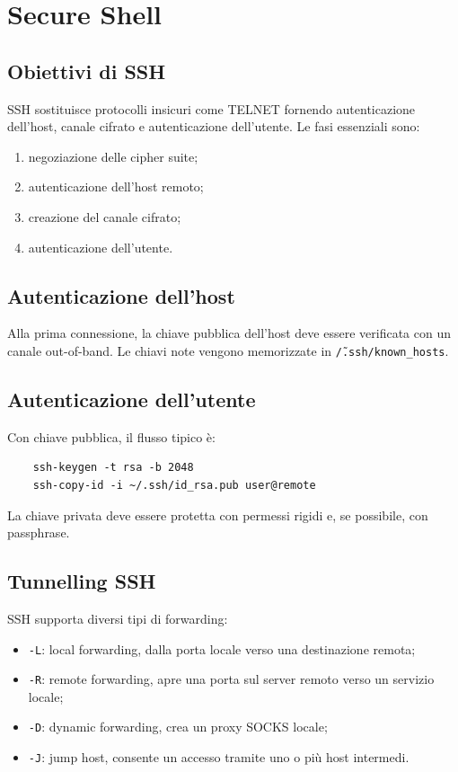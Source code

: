 \documentclass[12pt, a4paper]{report}
\begin{document}
\section{Secure Shell}

\subsection{Obiettivi di SSH}
SSH sostituisce protocolli insicuri come TELNET fornendo autenticazione dell'host, canale cifrato e autenticazione dell'utente. Le fasi essenziali sono:
\begin{enumerate}
	\item negoziazione delle cipher suite;
	\item autenticazione dell'host remoto;
	\item creazione del canale cifrato;
	\item autenticazione dell'utente.
\end{enumerate}

\subsection{Autenticazione dell'host}
Alla prima connessione, la chiave pubblica dell'host deve essere verificata con un canale out-of-band. Le chiavi note vengono memorizzate in \texttt{\~/.ssh/known\_hosts}.

\subsection{Autenticazione dell'utente}
Con chiave pubblica, il flusso tipico \`e:
\begin{verbatim}
	ssh-keygen -t rsa -b 2048
	ssh-copy-id -i ~/.ssh/id_rsa.pub user@remote
\end{verbatim}
La chiave privata deve essere protetta con permessi rigidi e, se possibile, con passphrase.

\subsection{Tunnelling SSH}
SSH supporta diversi tipi di forwarding:
\begin{itemize}
	\item \texttt{-L}: local forwarding, dalla porta locale verso una destinazione remota;
	\item \texttt{-R}: remote forwarding, apre una porta sul server remoto verso un servizio locale;
	\item \texttt{-D}: dynamic forwarding, crea un proxy SOCKS locale;
	\item \texttt{-J}: jump host, consente un accesso tramite uno o pi\`u host intermedi.
\end{itemize}
\end{document}
